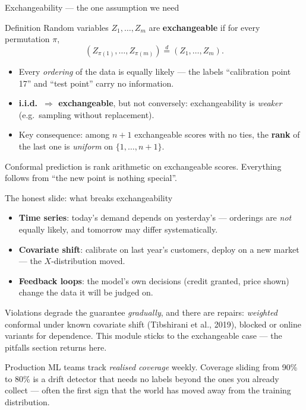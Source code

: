 \documentclass[aspectratio=169,11pt]{beamer}
\begin{document}
\begin{frame}{Exchangeability --- the one assumption we need}
  \footnotesize
  \begin{block}{Definition}
    Random variables $Z_1, \dots, Z_m$ are \textbf{exchangeable} if for every
    permutation $\pi$,
    \[
      (Z_{\pi(1)}, \dots, Z_{\pi(m)}) \overset{d}{=} (Z_1, \dots, Z_m).
    \]
  \end{block}
  \begin{readme}
    \begin{itemize}
      \item Every \emph{ordering} of the data is equally likely --- the labels
            ``calibration point 17'' and ``test point'' carry no information.
      \item \textbf{i.i.d.\ $\Rightarrow$ exchangeable}, but not conversely:
            exchangeability is \emph{weaker} (e.g.\ sampling without replacement).
      \item Key consequence: among $n + 1$ exchangeable scores with no ties, the
            \textbf{rank} of the last one is \emph{uniform} on $\{1, \dots, n+1\}$.
    \end{itemize}
  \end{readme}
  \begin{takeaway}
    Conformal prediction is rank arithmetic on exchangeable scores. Everything follows
    from ``the new point is nothing special''.
  \end{takeaway}
\end{frame}

\begin{frame}{The honest slide: what breaks exchangeability}
  \footnotesize
  \begin{itemize}
    \item \textbf{Time series}: today's demand depends on yesterday's --- orderings
          are \emph{not} equally likely, and tomorrow may differ systematically.
    \item \textbf{Covariate shift}: calibrate on last year's customers, deploy on a
          new market --- the $X$-distribution moved.
    \item \textbf{Feedback loops}: the model's own decisions (credit granted, price
          shown) change the data it will be judged on.
  \end{itemize}
  \begin{readme}
    Violations degrade the guarantee \emph{gradually}, and there are repairs:
    \emph{weighted} conformal under known covariate shift (Tibshirani et al., 2019),
    blocked or online variants for dependence. This module sticks to the exchangeable
    case --- the pitfalls section returns here.
  \end{readme}
  \begin{industry}
    Production ML teams track \emph{realised coverage} weekly. Coverage sliding from
    90\% to 80\% is a drift detector that needs no labels beyond the ones you already
    collect --- often the first sign that the world has moved away from the training
    distribution.
  \end{industry}
\end{frame}
\end{document}
